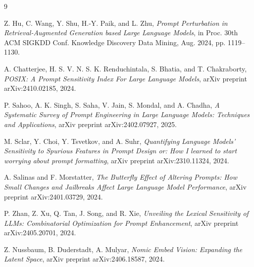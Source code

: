 \documentclass[a4paper,
               ]{jacow}
\begin{document}
%
%
%
	{\printbibliography}%
	{%
	
	\begin{thebibliography}{9} %
	
		Z. Hu, C. Wang, Y. Shu, H.-Y. Paik, and L. Zhu, \textit{Prompt Perturbation in Retrieval-Augmented Generation based Large Language Models}, in Proc. 30th ACM SIGKDD Conf. Knowledge Discovery Data Mining, Aug. 2024, pp. 1119--1130.

    		A. Chatterjee, H. S. V. N. S. K. Renduchintala, S. Bhatia, and T. Chakraborty, \textit{POSIX: A Prompt Sensitivity Index For Large Language Models}, arXiv preprint arXiv:2410.02185, 2024.
    
    		P. Sahoo, A. K. Singh, S. Saha, V. Jain, S. Mondal, and A. Chadha, \textit{A Systematic Survey of Prompt Engineering in Large Language Models: Techniques and Applications}, arXiv preprint arXiv:2402.07927, 2025.
    
    		M. Sclar, Y. Choi, Y. Tsvetkov, and A. Suhr, \textit{Quantifying Language Models' Sensitivity to Spurious Features in Prompt Design or: How I learned to start worrying about prompt formatting}, arXiv preprint arXiv:2310.11324, 2024.
    
    		A. Salinas and F. Morstatter, \textit{The Butterfly Effect of Altering Prompts: How Small Changes and Jailbreaks Affect Large Language Model Performance}, arXiv preprint arXiv:2401.03729, 2024.
    
    		P. Zhan, Z. Xu, Q. Tan, J. Song, and R. Xie, \textit{Unveiling the Lexical Sensitivity of LLMs: Combinatorial Optimization for Prompt Enhancement}, arXiv preprint arXiv:2405.20701, 2024.

    		Z. Nussbaum, B. Duderstadt, A. Mulyar, \textit{Nomic Embed Vision: Expanding the Latent Space}, arXiv preprint arXiv:2406.18587, 2024.
    
	\end{thebibliography}
} %
\end{document}
